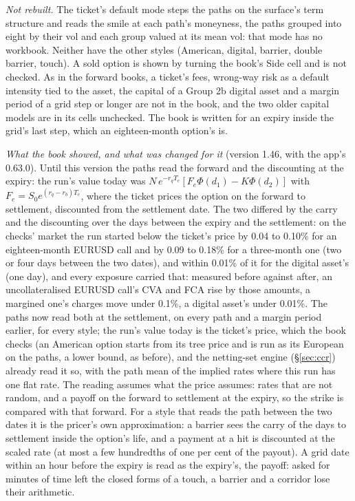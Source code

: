 \documentclass[11pt,a4paper]{article}
\begin{document}
\emph{Not rebuilt.} The ticket's default mode steps the paths on the surface's term structure and reads the smile at each path's moneyness, the paths grouped into eight by their vol and each group valued at its mean vol: that mode has no workbook. Neither have the other styles (American, digital, barrier, double barrier, touch). A sold option is shown by turning the book's Side cell and is not checked. As in the forward books, a ticket's fees, wrong-way risk as a default intensity tied to the asset, the capital of a Group 2b digital asset and a margin period of a grid step or longer are not in the book, and the two older capital models are in its cells unchecked. The book is written for an expiry inside the grid's last step, which an eighteen-month option's is.

\emph{What the book showed, and what was changed for it} (version 1.46, with the app's 0.63.0). Until this version the paths read the forward and the discounting at the expiry: the run's value today was $N\,e^{-r_qT_e}[F_e\Phi(d_1)-K\Phi(d_2)]$ with $F_e=S_0e^{(r_q-r_b)T_e}$, where the ticket prices the option on the forward to settlement, discounted from the settlement date. The two differed by the carry and the discounting over the days between the expiry and the settlement: on the checks' market the run started below the ticket's price by 0.04 to 0.10\% for an eighteen-month EURUSD call and by 0.09 to 0.18\% for a three-month one (two or four days between the two dates), and within 0.01\% of it for the digital asset's (one day), and every exposure carried that: measured before against after, an uncollateralised EURUSD call's CVA and FCA rise by those amounts, a margined one's charges move under 0.1\%, a digital asset's under 0.01\%. The paths now read both at the settlement, on every path and a margin period earlier, for every style; the run's value today is the ticket's price, which the book checks (an American option starts from its tree price and is run as its European on the paths, a lower bound, as before), and the netting-set engine (\S\ref{sec:ccr}) already read it so, with the path mean of the implied rates where this run has one flat rate. The reading assumes what the price assumes: rates that are not random, and a payoff on the forward to settlement at the expiry, so the strike is compared with that forward. For a style that reads the path between the two dates it is the pricer's own approximation: a barrier sees the carry of the days to settlement inside the option's life, and a payment at a hit is discounted at the scaled rate (at most a few hundredths of one per cent of the payout). A grid date within an hour before the expiry is read as the expiry's, the payoff: asked for minutes of time left the closed forms of a touch, a barrier and a corridor lose their arithmetic.
\end{document}

